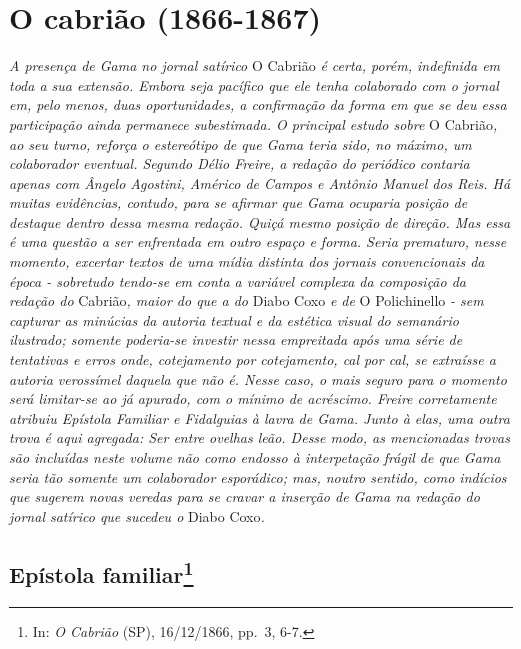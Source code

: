 
\part{O cabrião (1866-1867)}

\begin{argumento}
\emph{A presença de Gama no jornal satírico} O Cabrião \emph{é certa,
porém, indefinida em toda a sua extensão. Embora seja pacífico que ele
tenha colaborado com o jornal em, pelo menos, duas oportunidades, a
confirmação da forma em que se deu essa participação ainda permanece
subestimada. O principal estudo sobre} O Cabrião\emph{, ao seu turno,
reforça o estereótipo de que Gama teria sido, no máximo, um colaborador
eventual. Segundo Délio Freire, a redação do periódico contaria apenas
com Ângelo Agostini, Américo de Campos e Antônio Manuel dos Reis. Há
muitas evidências, contudo, para se afirmar que Gama ocuparia posição de
destaque dentro dessa mesma redação. Quiçá mesmo posição de direção. Mas
essa é uma questão a ser enfrentada em outro espaço e forma. Seria
prematuro, nesse momento, excertar textos de uma mídia distinta dos
jornais convencionais da época - sobretudo tendo-se em conta a variável
complexa da composição da redação do} Cabrião\emph{, maior do que a do}
Diabo Coxo \emph{e de} O Polichinello \emph{- sem capturar as minúcias
da autoria textual e da estética visual do semanário ilustrado; somente
poderia-se investir nessa empreitada após uma série de tentativas e
erros onde, cotejamento por cotejamento, cal por cal, se extraísse a
autoria verossímel daquela que não é. Nesse caso, o mais seguro para o
momento será limitar-se ao já apurado, com o mínimo de acréscimo. Freire
corretamente atribuiu Epístola Familiar e Fidalguias à lavra de Gama.
Junto à elas, uma outra trova é aqui agregada: Ser entre ovelhas leão.
Desse modo, as mencionadas trovas são incluídas neste volume não como
endosso à interpetação frágil de que Gama seria tão somente um
colaborador esporádico; mas, noutro sentido, como indícios que sugerem
novas veredas para se cravar a inserção de Gama na redação do jornal
satírico que sucedeu o} Diabo Coxo\emph{.}
\end{argumento}

\chapter{Epístola familiar\footnote{In: \emph{O Cabrião} (SP), 16/12/1866, pp.~3, 6-7.}}

